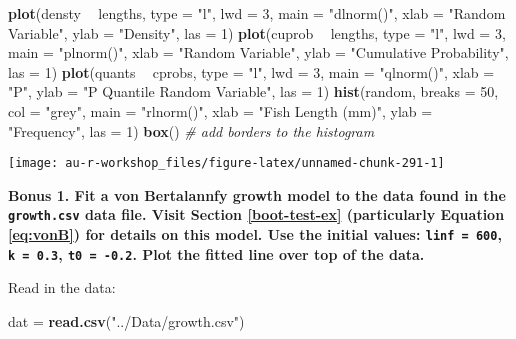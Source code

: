 \documentclass[]{book}
\newenvironment{Shaded}{\begin{snugshade}}{\end{snugshade}}
\newcommand{\KeywordTok}[1]{\textcolor[rgb]{0.13,0.29,0.53}{\textbf{#1}}}
\newcommand{\DataTypeTok}[1]{\textcolor[rgb]{0.13,0.29,0.53}{#1}}
\newcommand{\DecValTok}[1]{\textcolor[rgb]{0.00,0.00,0.81}{#1}}
\newcommand{\StringTok}[1]{\textcolor[rgb]{0.31,0.60,0.02}{#1}}
\newcommand{\CommentTok}[1]{\textcolor[rgb]{0.56,0.35,0.01}{\textit{#1}}}
\newcommand{\OperatorTok}[1]{\textcolor[rgb]{0.81,0.36,0.00}{\textbf{#1}}}
\newcommand{\NormalTok}[1]{#1}
\theoremstyle{definition}
\theoremstyle{definition}
\theoremstyle{definition}
\theoremstyle{remark}
\begin{document}
\begin{Shaded}
\begin{Highlighting}[]
\KeywordTok{plot}\NormalTok{(densty }\OperatorTok{~}\StringTok{ }\NormalTok{lengths, }\DataTypeTok{type =} \StringTok{"l"}\NormalTok{, }\DataTypeTok{lwd =} \DecValTok{3}\NormalTok{, }\DataTypeTok{main =} \StringTok{"dlnorm()"}\NormalTok{,}
     \DataTypeTok{xlab =} \StringTok{"Random Variable"}\NormalTok{, }\DataTypeTok{ylab =} \StringTok{"Density"}\NormalTok{, }\DataTypeTok{las =} \DecValTok{1}\NormalTok{)}
\KeywordTok{plot}\NormalTok{(cuprob }\OperatorTok{~}\StringTok{ }\NormalTok{lengths, }\DataTypeTok{type =} \StringTok{"l"}\NormalTok{, }\DataTypeTok{lwd =} \DecValTok{3}\NormalTok{, }\DataTypeTok{main =} \StringTok{"plnorm()"}\NormalTok{,}
     \DataTypeTok{xlab =} \StringTok{"Random Variable"}\NormalTok{, }\DataTypeTok{ylab =} \StringTok{"Cumulative Probability"}\NormalTok{, }\DataTypeTok{las =} \DecValTok{1}\NormalTok{)}
\KeywordTok{plot}\NormalTok{(quants }\OperatorTok{~}\StringTok{ }\NormalTok{cprobs, }\DataTypeTok{type =} \StringTok{"l"}\NormalTok{, }\DataTypeTok{lwd =} \DecValTok{3}\NormalTok{, }\DataTypeTok{main =} \StringTok{"qlnorm()"}\NormalTok{,}
     \DataTypeTok{xlab =} \StringTok{"P"}\NormalTok{, }\DataTypeTok{ylab =} \StringTok{"P Quantile Random Variable"}\NormalTok{, }\DataTypeTok{las =} \DecValTok{1}\NormalTok{)}
\KeywordTok{hist}\NormalTok{(random, }\DataTypeTok{breaks =} \DecValTok{50}\NormalTok{, }\DataTypeTok{col =} \StringTok{"grey"}\NormalTok{, }\DataTypeTok{main =} \StringTok{"rlnorm()"}\NormalTok{,}
     \DataTypeTok{xlab =} \StringTok{"Fish Length (mm)"}\NormalTok{, }\DataTypeTok{ylab =} \StringTok{"Frequency"}\NormalTok{, }\DataTypeTok{las =} \DecValTok{1}\NormalTok{)}
\KeywordTok{box}\NormalTok{() }\CommentTok{# add borders to the histogram}
\end{Highlighting}
\end{Shaded}

\begin{center}\texttt{[image: au-r-workshop\_files/figure-latex/unnamed-chunk-291-1]} \end{center}

\textbf{Bonus 1. Fit a von Bertalannfy growth model to the data found in
the \texttt{growth.csv} data file. Visit Section \ref{boot-test-ex}
(particularly Equation \eqref{eq:vonB}) for details on this model. Use the
initial values: \texttt{linf\ =\ 600}, \texttt{k\ =\ 0.3},
\texttt{t0\ =\ -0.2}. Plot the fitted line over top of the data.}

Read in the data:

\begin{Shaded}
\begin{Highlighting}[]
\NormalTok{dat =}\StringTok{ }\KeywordTok{read.csv}\NormalTok{(}\StringTok{"../Data/growth.csv"}\NormalTok{)}
\end{Highlighting}
\end{Shaded}
\end{document}
